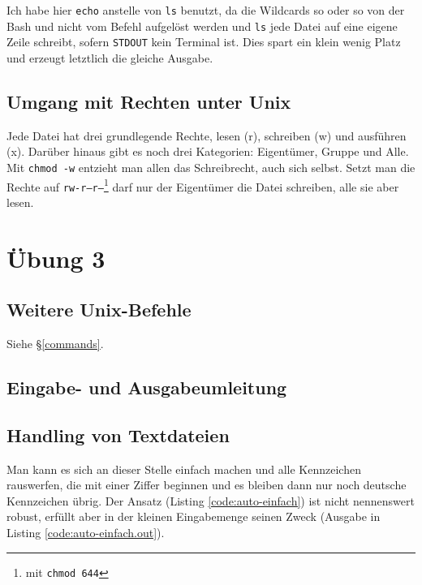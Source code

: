 
Ich habe hier \texttt{echo} anstelle von \texttt{ls} benutzt, da die Wildcards so oder so von der Bash und nicht vom Befehl aufgelöst werden und \texttt{ls} jede Datei auf eine eigene Zeile schreibt, sofern \texttt{STDOUT} kein Terminal ist. Dies spart ein klein wenig Platz und erzeugt letztlich die gleiche Ausgabe.

\section{Umgang mit Rechten unter Unix}

Jede Datei hat drei grundlegende Rechte, lesen (r), schreiben (w) und ausführen (x). Darüber hinaus gibt es noch drei Kategorien: Eigentümer, Gruppe und Alle. Mit \texttt{chmod -w} entzieht man allen das Schreibrecht, auch sich selbst. Setzt man die Rechte auf \texttt{rw-r--r--}\footnote{mit \texttt{chmod 644}} darf nur der Eigentümer die Datei schreiben, alle sie aber lesen.

\chapter{Übung 3}

\section{Weitere Unix-Befehle}

Siehe §\ref{commands}.

\section{Eingabe- und Ausgabeumleitung}


\section{Handling von Textdateien}

Man kann es sich an dieser Stelle einfach machen und alle Kennzeichen rauswerfen, die mit einer Ziffer beginnen und es bleiben dann nur noch deutsche Kennzeichen übrig. Der Ansatz (Listing \ref{code:auto-einfach}) ist nicht nennenswert robust, erfüllt aber in der kleinen Eingabemenge seinen Zweck (Ausgabe in Listing \ref{code:auto-einfach.out}).

